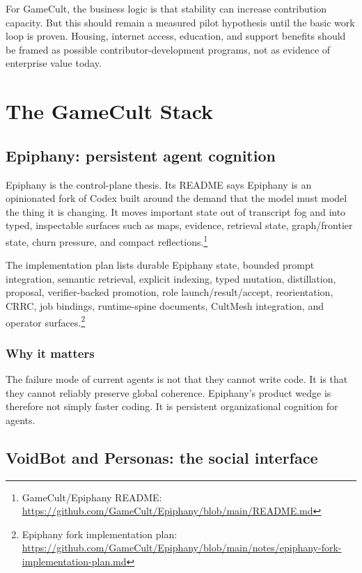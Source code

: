 \documentclass[11pt,oneside]{report}
\newcommand{\src}[2]{\footnote{#1: \url{#2}}}
\begin{document}
For GameCult, the business logic is that stability can increase contribution capacity. But this should remain a measured pilot hypothesis until the basic work loop is proven. Housing, internet access, education, and support benefits should be framed as possible contributor-development programs, not as evidence of enterprise value today.

\chapter{The GameCult Stack}

\section{Epiphany: persistent agent cognition}

Epiphany is the control-plane thesis. Its README says Epiphany is an opinionated fork of Codex built around the demand that the model must model the thing it is changing. It moves important state out of transcript fog and into typed, inspectable surfaces such as maps, evidence, retrieval state, graph/frontier state, churn pressure, and compact reflections.\src{GameCult/Epiphany README}{https://github.com/GameCult/Epiphany/blob/main/README.md}

The implementation plan lists durable Epiphany state, bounded prompt integration, semantic retrieval, explicit indexing, typed mutation, distillation, proposal, verifier-backed promotion, role launch/result/accept, reorientation, CRRC, job bindings, runtime-spine documents, CultMesh integration, and operator surfaces.\src{Epiphany fork implementation plan}{https://github.com/GameCult/Epiphany/blob/main/notes/epiphany-fork-implementation-plan.md}

\subsection{Why it matters}

The failure mode of current agents is not that they cannot write code. It is that they cannot reliably preserve global coherence. Epiphany's product wedge is therefore not simply faster coding. It is persistent organizational cognition for agents.

\section{VoidBot and Personas: the social interface}
\end{document}
